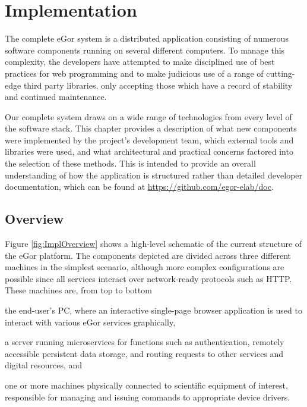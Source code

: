 \documentclass[../thesis]{subfiles}
\begin{document}
\chapter{Implementation}


The complete eGor system is a distributed application consisting of
numerous software components running on several different
computers. To manage this complexity, the developers have attempted to
make disciplined use of best practices for web programming and to make
judicious use of a range of cutting-edge third party libraries, only
accepting those which have a record of stability and continued
maintenance.

Our complete system draws on a wide range of technologies from every
level of the software stack. This chapter provides a description of
what new components were implemented by the project's development
team, which external tools and libraries were used, and what
architectural and practical concerns factored into the selection of
these methods. This is intended to provide an overall understanding of
how the application is structured rather than detailed developer
documentation, which can be found at
\url{https://github.com/egor-elab/doc}.



\section{Overview}

Figure \ref{fig:ImplOverview} shows a high-level schematic of the
current structure of the eGor platform. The components depicted are
divided across three different machines in the simplest scenario,
although more complex configurations are possible since all services
interact over network-ready protocols such as HTTP. These machines
are, from top to bottom
\begin{enumerate*}[label=(\roman*)]
  \item{
      the end-user's PC, where an interactive single-page browser
      application is used to interact with various eGor services
      graphically,
  }
  \item{
      a server running microservices for functions such as
      authentication, remotely accessible persistent data storage, and
      routing requests to other services and digital resources, and
  }
  \item{
      one or more machines physically connected to scientific
      equipment of interest, responsible for managing and issuing
      commands to appropriate device drivers.
  }
\end{enumerate*}
\end{document}
